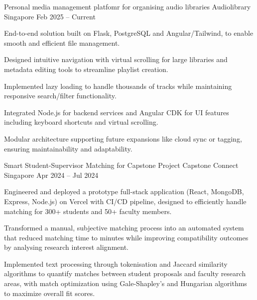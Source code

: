 

\begin{cventries}
    \cventry
    {Personal media management platfomr for organising audio libraries} %
    {Audiolibrary} %
    {Singapore} %
    {Feb 2025 – Current} %
    {
        \begin{cvitems} %
            \item {End-to-end solution built on Flask, PostgreSQL and Angular/Tailwind, to enable smooth and efficient file management.}
            \item {Designed intuitive navigation with virtual scrolling for large libraries and metadata editing tools to streamline playlist creation.}
            \item {Implemented lazy loading to handle thousands of tracks while maintaining responsive search/filter functionality.}
            \item {Integrated Node.js for backend services and Angular CDK for UI features including keyboard shortcuts  and virtual scrolling.}
            \item {Modular architecture supporting future expansions like cloud sync or tagging, ensuring maintainability and adaptability.}
            \vspace{5mm}
        \end{cvitems}
    }

    \cventry
    {Smart Student-Supervisor Matching for Capstone Project} %
    {Capstone Connect} %
    {Singapore} %
    {Apr 2024 – Jul 2024} %
    {
        \begin{cvitems} %
            \item {Engineered and deployed a prototype full-stack application (React, MongoDB, Express, Node.js) on Vercel with CI/CD pipeline, designed to efficiently handle matching for 300+ students and 50+ faculty members.}
            \item {Transformed a manual, subjective matching process into an automated system that reduced matching time to minutes while improving compatibility outcomes by analysing research interest alignment.}
            \item {Implemented text processing through tokenisation and Jaccard similarity algorithms to quantify matches between student proposals and faculty research areas, with match optimization using Gale-Shapley's and Hungarian algorithms to maximize overall fit scores.}
            \vspace{5mm}
        \end{cvitems}
    }


\end{cventries}
